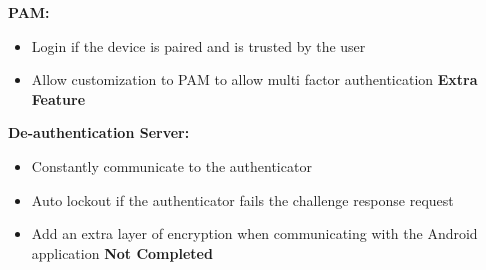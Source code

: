 \documentclass[letterpaper,twocolumn,10pt]{article}
\begin{document}
\textbf{PAM:}
\begin{itemize}
\item Login if the device is paired and is trusted by the user
\item Allow customization to PAM to allow multi factor authentication \textbf{Extra  Feature}
\end{itemize}

\textbf{De-authentication Server:}
\begin{itemize}
\item Constantly communicate to the authenticator
\item Auto lockout if the authenticator fails the challenge response request
\item Add an extra layer of encryption when communicating with the Android application \textbf{Not Completed}
\end{itemize}

\label{ssec:num2}

\end{document}
